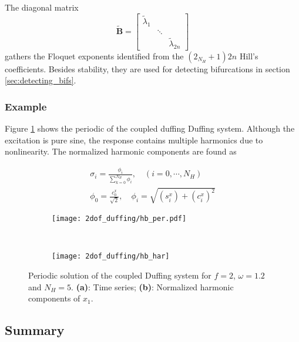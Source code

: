 The diagonal matrix
\begin{equation}
  \label{eq:hb_B_tilde}
  \tilde{\bm B} =
  \begin{bmatrix}
    \tilde \lambda_1 \\
    & \ddots \\
    & & \tilde \lambda_{2n}
  \end{bmatrix}
\end{equation}
gathers the Floquet exponents identified from the $(2_{N_H} + 1)2n$ Hill's
coefficients. Besides stability, they are used for detecting bifurcations in
section \ref{sec:detecting_bifs}.

\subsubsection{Example}
\label{sec:hb_example}

Figure \ref{fig:hb_duffing_periodic} shows the periodic of the coupled duffing
Duffing system. Although the excitation is pure sine, the response contains
multiple harmonics due to nonlinearity. The normalized harmonic components are
found as

\begin{equation}
  \label{eq:hb_normal_coeff}
  \begin{aligned}
    \sigma_i = \frac{\phi_i}{\sum_{k=0}^{N_H} \phi_i}, \quad (i=0,\cdots, N_H) \\
    \phi_0 = \frac{c_0^x}{\sqrt{2}}, \quad \phi_i = \sqrt{(s^x_i) + (c^x_i)^2}
  \end{aligned}
\end{equation}

\begin{figure}[!ht]
  \centering
  \begin{subfigure}[b]{0.6\textwidth}
    \texttt{[image: 2dof\_duffing/hb\_per.pdf]}
    \caption{}
  \end{subfigure}
  ~
  \begin{subfigure}[b]{0.36\textwidth}
    \texttt{[image: 2dof\_duffing/hb\_har]}
    \caption{}
  \end{subfigure}
    \caption{Periodic solution of the coupled Duffing system for $f=2$,
    $\omega=1.2$ and $N_H=5$.
    \textbf{(a)}: Time series;
    \textbf{(b)}: Normalized harmonic components of $x_1$.}
  \label{fig:hb_duffing_periodic}
\end{figure}
\FloatBarrier

\subsection{Summary}
\label{sec:per_summary}


